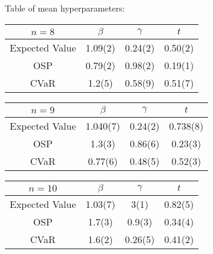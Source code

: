 Table of mean hyperparameters:

\begin{tabular}{c||c|c|c}
    $n=8$          & $\beta$ & $\gamma$ & $t$     \\\hline\hline
    Expected Value & 1.09(2) & 0.24(2)  & 0.50(2) \\\hline
    OSP            & 0.79(2) & 0.98(2)  & 0.19(1) \\\hline
    CVaR           & 1.2(5)  & 0.58(9)  & 0.51(7) 
\end{tabular}

\begin{tabular}{c||c|c|c}
    $n=9$          & $\beta$ & $\gamma$ & $t$      \\\hline\hline
    Expected Value & 1.040(7)& 0.24(2)  & 0.738(8) \\\hline
    OSP            & 1.3(3)  & 0.86(6)  & 0.23(3)  \\\hline
    CVaR           & 0.77(6) & 0.48(5)  & 0.52(3) 
\end{tabular}

\begin{tabular}{c||c|c|c}
    $n=10$         & $\beta$ & $\gamma$ & $t$     \\\hline\hline
    Expected Value & 1.03(7) & 3(1)     & 0.82(5) \\\hline
    OSP            & 1.7(3)  & 0.9(3)   & 0.34(4) \\\hline
    CVaR           & 1.6(2)  & 0.26(5)  & 0.41(2)
\end{tabular}
